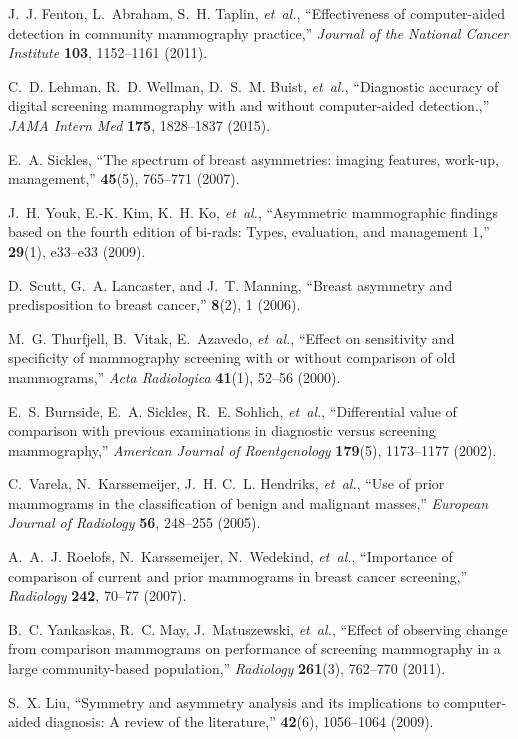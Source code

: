 \documentclass[12pt]{spieman}  %
\begin{document}
\begin{thebibliography}{10}
J.~J. Fenton, L.~Abraham, S.~H. Taplin, {\em et~al.}, ``Effectiveness of
  computer-aided detection in community mammography practice,'' {\em Journal of
  the National Cancer Institute} {\bf 103}, 1152--1161  (2011).

C.~D. Lehman, R.~D. Wellman, D.~S.~M. Buist, {\em et~al.}, ``Diagnostic
  accuracy of digital screening mammography with and without computer-aided
  detection.,'' {\em JAMA Intern Med} {\bf 175}, 1828--1837  (2015).

E.~A. Sickles, ``The spectrum of breast asymmetries: imaging features, work-up,
  management,''  {\bf 45}(5), 765--771  (2007).

J.~H. Youk, E.-K. Kim, K.~H. Ko, {\em et~al.}, ``Asymmetric mammographic
  findings based on the fourth edition of bi-rads: Types, evaluation, and
  management 1,''  {\bf 29}(1), e33--e33  (2009).

D.~Scutt, G.~A. Lancaster, and J.~T. Manning, ``Breast asymmetry and
  predisposition to breast cancer,''  {\bf 8}(2), 1  (2006).

M.~G. Thurfjell, B.~Vitak, E.~Azavedo, {\em et~al.}, ``Effect on sensitivity
  and specificity of mammography screening with or without comparison of old
  mammograms,'' {\em Acta Radiologica} {\bf 41}(1), 52--56  (2000).

E.~S. Burnside, E.~A. Sickles, R.~E. Sohlich, {\em et~al.}, ``Differential
  value of comparison with previous examinations in diagnostic versus screening
  mammography,'' {\em American Journal of Roentgenology} {\bf 179}(5),
  1173--1177  (2002).

C.~Varela, N.~Karssemeijer, J.~H. C.~L. Hendriks, {\em et~al.}, ``Use of prior
  mammograms in the classification of benign and malignant masses,'' {\em
  European Journal of Radiology} {\bf 56}, 248--255  (2005).

A.~A.~J. Roelofs, N.~Karssemeijer, N.~Wedekind, {\em et~al.}, ``Importance of
  comparison of current and prior mammograms in breast cancer screening,'' {\em
  Radiology} {\bf 242}, 70--77  (2007).

B.~C. Yankaskas, R.~C. May, J.~Matuszewski, {\em et~al.}, ``Effect of observing
  change from comparison mammograms on performance of screening mammography in
  a large community-based population,'' {\em Radiology} {\bf 261}(3), 762--770
  (2011).

S.~X. Liu, ``Symmetry and asymmetry analysis and its implications to
  computer-aided diagnosis: A review of the literature,''  {\bf 42}(6),
  1056--1064  (2009).


\end{thebibliography}
\end{document}
